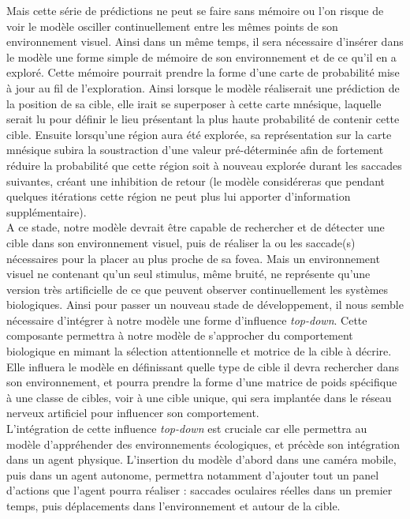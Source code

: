 Mais cette série de prédictions ne peut se faire sans mémoire ou l'on risque de voir le modèle osciller continuellement entre les mêmes points de son environnement visuel.
Ainsi dans un même temps, il sera nécessaire d'insérer dans le modèle une forme simple de mémoire de son environnement et de ce qu'il en a exploré.
Cette mémoire pourrait prendre la forme d'une carte de probabilité mise à jour au fil de l'exploration.
Ainsi lorsque le modèle réaliserait une prédiction de la position de sa cible, elle irait se superposer à cette carte mnésique, laquelle serait lu pour définir le lieu présentant la plus haute probabilité de contenir cette cible.
Ensuite lorsqu'une région aura été explorée, sa représentation sur la carte mnésique subira la soustraction d'une valeur pré-déterminée afin de fortement réduire la probabilité que cette région soit à nouveau explorée durant les saccades suivantes, créant une inhibition de retour (le modèle considéreras que pendant quelques itérations cette région ne peut plus lui apporter d'information supplémentaire). \autocite{Najemnik2005, Werner2014, Zhaoping2014} \\
A ce stade, notre modèle devrait être capable de rechercher et de détecter une cible dans son environnement visuel, puis de réaliser la ou les saccade(s) nécessaires pour la placer au plus proche de sa fovea.
Mais un environnement visuel ne contenant qu'un seul stimulus, même bruité, ne représente qu'une version très artificielle de ce que peuvent observer continuellement les systèmes biologiques.
Ainsi pour passer un nouveau stade de développement, il nous semble nécessaire d'intégrer à notre modèle une forme d'influence \textit{top-down}.
Cette composante permettra à notre modèle de s'approcher du comportement biologique en mimant la sélection attentionnelle et motrice de la cible à décrire.
Elle influera le modèle en définissant quelle type de cible il devra rechercher dans son environnement, et pourra prendre la forme d'une matrice de poids spécifique à une classe de cibles, voir à une cible unique, qui sera implantée dans le réseau nerveux artificiel pour influencer son comportement. \autocite{Werner2014} \\
L'intégration de cette influence \textit{top-down} est cruciale car elle permettra au modèle d'appréhender des environnements écologiques, et précède son intégration dans un agent physique.
L'insertion du modèle d'abord dans une caméra mobile, puis dans un agent autonome, permettra notamment d'ajouter tout un panel d'actions que l'agent pourra réaliser : saccades oculaires réelles dans un premier temps, puis déplacements dans l'environnement et autour de la cible.
